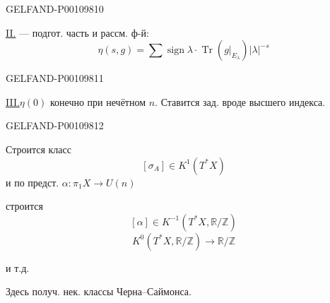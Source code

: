 \begin{GelfandAdjacentEvidence}{GELFAND-P001098}{10}


\underline{II.} — подгот. часть и рассм. ф-й:
\[
\eta(s,g)=\sum\operatorname{sign}\lambda\cdot
\operatorname{Tr}(g|_{E_\lambda})\lvert\lambda\rvert^{-s}
\]
\end{GelfandAdjacentEvidence}
\begin{GelfandAdjacentEvidence}{GELFAND-P001098}{11}


\underline{III.} $\eta(0)$ конечно при нечётном $n$.
Ставится зад. вроде высшего индекса.
\end{GelfandAdjacentEvidence}
\begin{GelfandAdjacentEvidence}{GELFAND-P001098}{12}


Строится класс
\[
[\sigma_A]\in K^1(T^*X)
\]
и по предст. $\alpha:\pi_1 X\to U(n)$

строится
\[
[\alpha]\in K^{-1}(T^*X,\mathbb R/\mathbb Z)
\]
\[
K^0(T^*X,\mathbb R/\mathbb Z)\to\mathbb R/\mathbb Z
\]
\end{GelfandAdjacentEvidence}


и т.д.

Здесь получ. нек. классы Черна–Саймонса.


